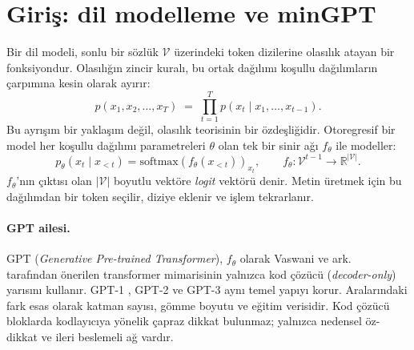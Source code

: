 \section{Giriş: dil modelleme ve minGPT}\label{sec:giris}

Bir dil modeli, sonlu bir sözlük $\mathcal{V}$ üzerindeki token dizilerine olasılık atayan bir fonksiyondur. Olasılığın zincir kuralı, bu ortak dağılımı koşullu dağılımların çarpımına kesin olarak ayırır:
\begin{equation}
  p(x_1, x_2, \dots, x_T) \;=\; \prod_{t=1}^{T} p\left(x_t \mid x_1, \dots, x_{t-1}\right).
\end{equation}
Bu ayrışım bir yaklaşım değil, olasılık teorisinin bir özdeşliğidir. Otoregresif bir model her koşullu dağılımı parametreleri $\theta$ olan tek bir sinir ağı $f_\theta$ ile modeller:
\begin{equation}
  p_\theta\left(x_t \mid x_{<t}\right) = \mathrm{softmax}\left(f_\theta(x_{<t})\right)_{x_t},
  \qquad f_\theta : \mathcal{V}^{t-1} \rightarrow \mathbb{R}^{|\mathcal{V}|}.
\end{equation}
$f_\theta$'nın çıktısı olan $|\mathcal{V}|$ boyutlu vektöre \emph{logit} vektörü denir. Metin üretmek için bu dağılımdan bir token seçilir, diziye eklenir ve işlem tekrarlanır.

\paragraph{GPT ailesi.} GPT (\emph{Generative Pre-trained Transformer}), $f_\theta$ olarak Vaswani ve ark.\ \cite{vaswani} tarafından önerilen transformer mimarisinin yalnızca kod çözücü (\emph{decoder-only}) yarısını kullanır. GPT-1 \cite{radford18}, GPT-2 \cite{radford19} ve GPT-3 \cite{brown20} aynı temel yapıyı korur. Aralarındaki fark esas olarak katman sayısı, gömme boyutu ve eğitim verisidir. Kod çözücü bloklarda kodlayıcıya yönelik çapraz dikkat bulunmaz; yalnızca nedensel öz-dikkat ve ileri beslemeli ağ vardır.

